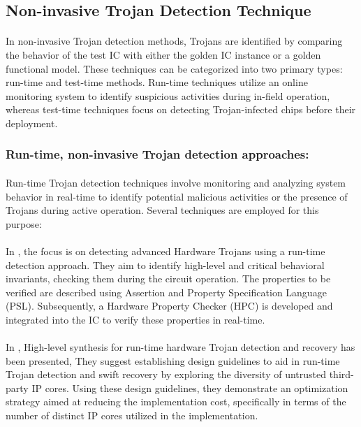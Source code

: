 \subsection{Non-invasive Trojan Detection Technique}
\paragraph*{}
In non-invasive Trojan detection methods, Trojans are identified by comparing the behavior of the test IC with either the golden IC instance or a golden functional model. These techniques can be categorized into two primary types: run-time and test-time methods. Run-time techniques utilize an online monitoring system to identify suspicious activities during in-field operation, whereas test-time techniques focus on detecting Trojan-infected chips before their deployment.
\subsubsection{Run-time, non-invasive Trojan detection approaches:}
\paragraph*{}
Run-time Trojan detection techniques involve monitoring and analyzing system behavior in real-time to identify potential malicious activities or the presence of Trojans during active operation. Several techniques are employed for this purpose:
\paragraph*{}
In \cite{7300085}, the focus is on detecting advanced Hardware Trojans using a run-time detection approach. They aim to identify high-level and critical behavioral invariants, checking them during the circuit operation. The properties to be verified are described using Assertion and Property Specification Language (PSL). Subsequently, a Hardware Property Checker (HPC) is developed and integrated into the IC to verify these properties in real-time.
\paragraph*{}
In \cite{6881484}, High-level synthesis for run-time hardware Trojan detection and recovery has been presented, They suggest establishing design guidelines to aid in run-time Trojan detection and swift recovery by exploring the diversity of untrusted third-party IP cores. Using these design guidelines, they demonstrate an optimization strategy aimed at reducing the implementation cost, specifically in terms of the number of distinct IP cores utilized in the implementation.
